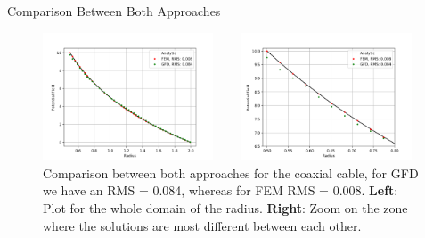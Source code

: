 \documentclass{beamer}
\begin{document}
\begin{frame}{Comparison Between Both Approaches}
\begin{figure}[h]
\begin{columns}
    \begin{column}{0.5\linewidth}
        \includegraphics[width=0.95\textwidth]{Figures/ComparissonPotentialFEMGFD.png}
    \end{column}
    \begin{column}{0.5\linewidth}
        \includegraphics[width=0.95\textwidth]{Figures/ComparissonPotentialFEMGFD_Zoom.png}
    \end{column}
\end{columns}
\caption{Comparison between both approaches for the coaxial cable, for GFD we have an RMS = 0.084, whereas for FEM RMS = 0.008. \textbf{Left}: Plot for the whole domain of the radius. \textbf{Right}: Zoom on the zone where the solutions are most different between each other.}
\label{fig:Comparison_GFD_FEM}
\end{figure}
\end{frame}
\end{document}
